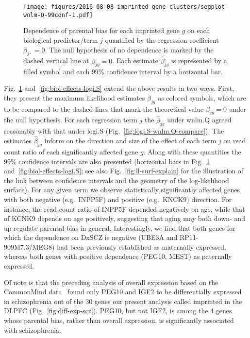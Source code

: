 \documentclass[letterpaper]{article}
\begin{document}
\begin{figure}
\begin{center}
\texttt{[image: figures/2016-08-08-imprinted-gene-clusters/segplot-wnlm-Q-99conf-1.pdf]}
\end{center}
\caption{ 
Dependence of parental bias for each imprinted gene \(g\)
on each biological predictor/term \(j\) quantified by the regression coefficient
\(\beta_{j\cdot} = 0\).  The null hypothesis of no dependence is marked by the dashed
vertical line at \(\beta_{jg}=0\).  Each estimate \(\hat{\beta}_{jg}\) is
represented by a filled symbol and each 99\% confidence interval by a horizontal
bar.
}
\label{fig:biol-effects-wnlm.Q}
\end{figure}

Fig.~\ref{fig:biol-effects-wnlm.Q} and~\ref{fig:biol-effects-logi.S} extend
the above results in two ways. First, they present the maximum likelihood
estimates \(\hat\beta_{jg}\) as colored symbols, which are to be compared to
the dashed lines that mark the theoretical value \(\beta_{jg} = 0\) under
the null hypothesis.  For each regression term \(j\) the \(\hat\beta_{jg}\)
under wnlm.Q agreed reasonably with that under logi.S
(Fig.~\ref{fig:logi.S-wnlm.Q-compare}).  The estimates \(\hat\beta_{jg}\)
inform on the direction and size of the effect of each term \(j\) on read
count ratio of each significantly affected gene \(g\).  Along with these
quantities the 99\% confidence intervals are also presented (horizontal bars
in Fig.~\ref{fig:biol-effects-wnlm.Q} and~\ref{fig:biol-effects-logi.S}; see
also Fig.~\ref{fig:ll-surf-explain} for the illustration of the link between
confidence intervals and the geometry of the log-likelihood surface). For any
given term we observe statistically significantly affected genes with both negative
(e.g.~INPP5F) and positive (e.g.~KNCK9) direction.  For instance, the read
count ratio of INPP5F depended negatively on age, while that of KCNK9
depends on age positively, suggesting that aging may both down- and up-regulate parental
bias in general. Interestingly, we find that both genes for which the dependence on
DxSCZ is negative (UBE3A and RP11-909M7.3/MEG8) had been previously
established as maternally expressed, whereas both genes with positive
dependence (PEG10, MEST) as paternally expressed.

Of note is that the preceding analysis of overall expression based on the
CommonMind data~\cite{Fromer2016a} found only PEG10 and IGF2 to be
differentially expressed in schizophrenia out of the 30 genes our present
analysis called imprinted in the DLPFC (Fig.~\ref{fig:diff-exp-scz}). PEG10,
but not IGF2, is among the 4 genes whose parental bias, rather than overall
expression, is significantly associated with schizophrenia.
\end{document}
